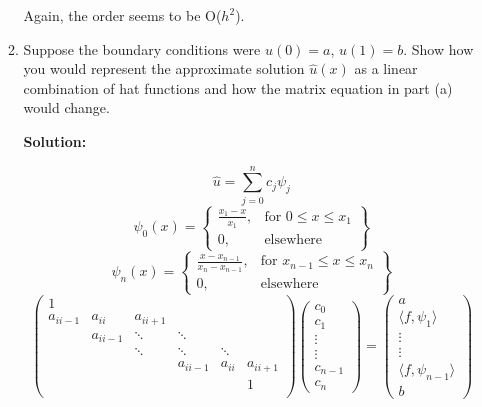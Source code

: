 \documentclass[letterpaper,12pt]{article}
\begin{document}
\begin{enumerate}
\begin{enumerate}
Again, the order seems to be O($h^2$).
\item
Suppose the boundary conditions were $u(0) = a$, $u(1) = b$.  Show how you would
represent the approximate solution $\hat{u} (x)$ as a linear combination of hat
functions and how the matrix equation in part (a) would change.

 {\bf Solution:}

 
  \[\hat{u} = \sum_{j=0}^{n} c_j \psi_j\]
   \[
    \psi_0(x) = \left\{\begin{array}{lr}
        \frac{x_1-x}{x_1}, & \text{for } 0\leq x\leq x_1\\

        0, & \text{elsewhere } 
        \end{array}\right\} \]
    \[
    \psi_n(x) = \left\{\begin{array}{lr}
        \frac{x-x_{n-1}}{x_n-x_{n-1}}, & \text{for } x_{n-1}\leq x\leq x_n\\

        0, & \text{elsewhere } 
        \end{array}\right\} \]  
\[
 \left( \begin{array}{cccccc}
 1   &  &   &    &              \\
a_{ii-1}    & a_{ii} & a_{ii+1}  &    &              \\
    &  a_{ii-1}  & \ddots & \ddots   &    \\
     &    & \ddots & \ddots  &\ddots   \\
         &       &        &  a_{ii-1}     & a_{ii}  & a_{ii+1}\\
             &  &   &    &       & 1       \\\end{array} \right)
\left( \begin{array}{c} c_0\\ c_1 \\ \vdots \\ \vdots \\ c_{n-1} \\ c_n \end{array} 
\right) =
\left( \begin{array}{c}  a \\ \langle f,\psi_1 \rangle \\ \vdots \\  \vdots \\
\langle f, \psi_{n-1} \rangle \\ b \end{array} \right) 
\]
\end{enumerate}


\end{enumerate}
\end{document}
